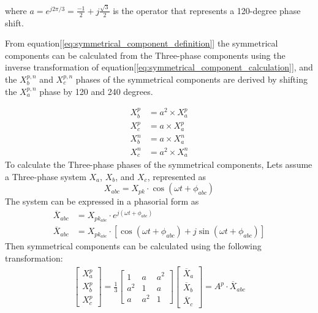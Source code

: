 where \( a = e^{j2\pi/3} = \frac{-1}{2} + j\frac{\sqrt{3}}{2} \) is the operator
that represents a 120-degree phase shift.\par
From equation[\ref{eq:symmetrical_component_definition}] the symmetrical components
can be calculated from the Three-phase components using the inverse transformation
of equation[\ref{eq:symmetrical_component_calculation}], and the \(X^{p,n}_b\) and \(X^{p,n}_c\)
phases of the symmetrical components are derived by shifting the \(X^{p,n}_a\) phase by
120 and 240 degrees.\par
\begin{equation}
    \begin{split}
        X^p_b &= a^2 \times X^p_a \\
        X^p_c &= a \times X^p_a \\
        X^n_b &= a \times X^n_a \\
        X^n_c &= a^2 \times X^n_a
    \end{split}
\end{equation}
To calculate the Three-phase phases of the symmetrical components, Lets assume a
Three-phase system \( X_a \), \( X_b \), and \( X_c \), represented as
\begin{equation}
    X_{abc} = X_{pk} \cdot \cos(\omega t + \phi_{abc})
    \label{eq:three_phase_system}
\end{equation}
The system can be expressed in a phasorial form as
\begin{equation}
    \begin{split}
        \overline{X}_{abc} &= X_{pk_{abc}}\cdot e^{j(\omega t + \phi_{abc})} \\
        \overline{X}_{abc} &= X_{pk_{abc}}\cdot [\cos(\omega t + \phi_{abc}) + j \sin(\omega t + \phi_{abc})]
    \end{split}
    \label{eq:three_phase_system_phasor}
\end{equation}
Then symmetrical components can be calculated using the following transformation:
\begin{equation}
    \begin{split}
        \begin{bmatrix}
            X^p_a \\
            X^p_b \\
            X^p_c
        \end{bmatrix}
        =
        \frac{1}{3}
        \begin{bmatrix}
            1   & a   & a^2 \\
            a^2 & 1   & a   \\
            a   & a^2 & 1
        \end{bmatrix}
        \begin{bmatrix}
            \overline{X}_a \\
            \overline{X}_b \\
            \overline{X}_c
        \end{bmatrix} = A^p \cdot \overline{X}_{abc}
    \end{split}
    \label{eq:symmetrical_components_transformation_positive}
\end{equation}
